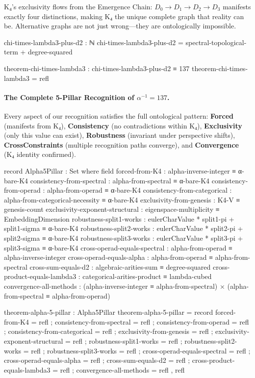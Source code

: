 \documentclass[11pt,a4paper]{book}
\begin{document}
K₄'s exclusivity flows from the Emergence Chain: $D_0 \to D_1 \to D_2 \to D_3$ manifests exactly four distinctions, making K₄ the unique complete graph that reality can be. Alternative graphs are not just wrong—they are ontologically impossible.

\begin{code}
chi-times-lambda3-plus-d2 : ℕ
chi-times-lambda3-plus-d2 = spectral-topological-term + degree-squared

theorem-chi-times-lambda3 : chi-times-lambda3-plus-d2 ≡ 137
theorem-chi-times-lambda3 = refl
\end{code}

\paragraph{The Complete 5-Pillar Recognition of $\alpha^{-1} = 137$.}

Every aspect of our recognition satisfies the full ontological pattern:
\textbf{Forced} (manifests from K₄),
\textbf{Consistency} (no contradictions within K₄), 
\textbf{Exclusivity} (only this value can exist),
\textbf{Robustness} (invariant under perspective shifts),
\textbf{CrossConstraints} (multiple recognition paths converge), and
\textbf{Convergence} (K₄ identity confirmed).

\begin{code}
record Alpha5Pillar : Set where
  field
    forced-from-K4               : alpha-inverse-integer ≡ α-bare-K4
    consistency-from-spectral      : alpha-from-spectral ≡ α-bare-K4
    consistency-from-operad        : alpha-from-operad ≡ α-bare-K4
    consistency-from-categorical   : alpha-from-categorical-necessity ≡ α-bare-K4
    exclusivity-from-genesis       : K4-V ≡ genesis-count
    exclusivity-exponent-structural : eigenspace-multiplicity ≡ EmbeddingDimension
    robustness-split1-works        : eulerCharValue * split1-pi + split1-sigma ≡ α-bare-K4
    robustness-split2-works        : eulerCharValue * split2-pi + split2-sigma ≡ α-bare-K4
    robustness-split3-works        : eulerCharValue * split3-pi + split3-sigma ≡ α-bare-K4
    cross-operad-equals-spectral   : alpha-from-operad ≡ alpha-inverse-integer
    cross-operad-equals-alpha      : alpha-from-operad ≡ alpha-from-spectral
    cross-sum-equals-d2            : algebraic-arities-sum ≡ degree-squared
    cross-product-equals-lambda3   : categorical-arities-product ≡ lambda-cubed
    convergence-all-methods        : (alpha-inverse-integer ≡ alpha-from-spectral) × (alpha-from-spectral ≡ alpha-from-operad)

theorem-alpha-5-pillar : Alpha5Pillar
theorem-alpha-5-pillar = record
  { forced-from-K4             = refl
  ; consistency-from-spectral    = refl
  ; consistency-from-operad      = refl
  ; consistency-from-categorical = refl
  ; exclusivity-from-genesis     = refl
  ; exclusivity-exponent-structural = refl
  ; robustness-split1-works      = refl
  ; robustness-split2-works      = refl
  ; robustness-split3-works      = refl
  ; cross-operad-equals-spectral = refl
  ; cross-operad-equals-alpha    = refl
  ; cross-sum-equals-d2          = refl
  ; cross-product-equals-lambda3 = refl
  ; convergence-all-methods      = refl , refl
  }
\end{code}
\end{document}
